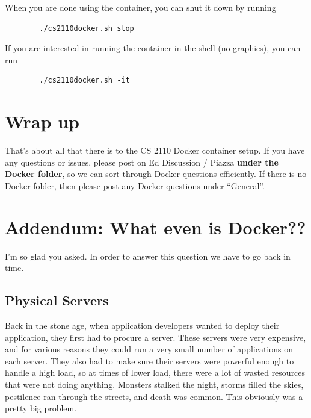 When you are done using the container, you can shut it down by running

\begin{center}
    \begin{verbatim}
        ./cs2110docker.sh stop
    \end{verbatim}
\end{center}

If you are interested in running the container in the shell (no graphics), you can run

\begin{center}
    \begin{verbatim}
        ./cs2110docker.sh -it
    \end{verbatim}
\end{center}


\section{Wrap up}
That’s about all that there is to the CS 2110 Docker container setup. If you have any questions or issues, please post on Ed Discussion / Piazza \textbf{under the Docker folder}, so we can sort through Docker questions efficiently. If there is no Docker folder, then please post any Docker questions under ``General''.

\section{Addendum: What even is Docker??}
I’m so glad you asked. In order to answer this question we have to go back in time.

\subsection{Physical Servers}
Back in the stone age, when application developers wanted to deploy their application, they first had to procure a server. These servers were very expensive, and for various reasons they could run a very small number of applications on each server. They also had to make sure their servers were powerful enough to handle a high load, so at times of lower load, there were a lot of wasted resources that were not doing anything. Monsters stalked the night, storms filled the skies, pestilence ran through the streets, and death was common. This obviously was a pretty big problem.

